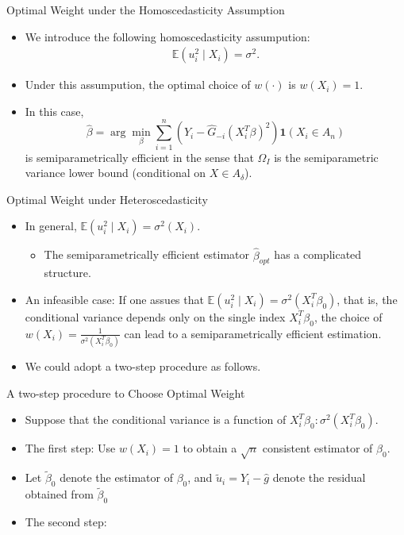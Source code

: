 \documentclass[xcolor=svgnames,dvipdfmx,cjk]{beamer}
\theoremstyle{example}
\def\E{\mathbb{E}}
\begin{document}
  
  \begin{frame}{Optimal Weight under the Homoscedasticity Assumption}
  \begin{itemize}
    \item We introduce the following homoscedasticity assumpution:
          \begin{align*}
            \E(u_i^2 \mid X_i) = \sigma^2.
          \end{align*}
    \item Under this assumpution, the optimal choice of $w(\cdot)$ is $w(X_i)=1$.
    \item In this case, 
          \[ \hat{\beta} = \arg\min_{\beta} \sum_{i=1}^{n} (Y_i - \hat{G}_{-i}(X_i^{T}\beta)^2)\mathbf{1}(X_i \in A_n) \]
          is \alert{semiparametrically efficient} in the sense that 
          $\Omega_I$ is \alert{the semiparametric variance lower bound} (conditional on $X \in A_\delta$).
  \end{itemize}
  \end{frame}
  
  \begin{frame}{Optimal Weight under Heteroscedasticity}
    \begin{itemize}
      \item In general, $\E(u_i^2 \mid X_i) = \sigma^2(X_i)$.
        \begin{itemize}
          \item The semiparametrically efficient estimator $\hat{\beta}_{opt}$ has a complicated structure.
        \end{itemize}
      \item \alert{An infeasible case}: 
            If one assues that  $\E(u_i^2 \mid X_i) = \sigma^2(X_i^{T}\beta_0)$,
            that is, the conditional variance depends only on the single index $X_i^{T}\beta_0$,
            the choice of $w(X_i) = \frac{1}{\sigma^2({X_i^{T}\beta_0})}$ can lead to a semiparametrically efficient estimation.
      \item We could adopt a two-step procedure as follows.
    \end{itemize}
  \end{frame}
  
  \begin{frame}{A two-step procedure to Choose Optimal Weight}
    \begin{itemize}
      \item Suppose that the conditional variance is a function of $X_i^{T}\beta_0: \sigma^2({X_i^{T}\beta_0}).$
      \item \alert{The first step}: Use $w(X_i)=1$ to obtain a $\sqrt{n}$ consistent estimator of $\beta_0$.
        
      \item Let $\tilde{\beta}_0$ denote the estimator of $\beta_0$, 
            and $\tilde{u}_i = Y_i - \hat{g}$ denote the residual obtained from $\tilde{\beta}_0$
      \item \alert{The second step}:
    \end{itemize}
  \end{frame}
  
\end{document}
